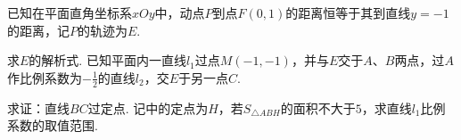 \documentclass[10pt]{article}
\begin{document}
\setcounter{taskcounter}{23}
\begin{questions}{}
\question 已知在平面直角坐标系$xOy$中，动点$P$到点$F(0,1)$的距离恒等于其到直线$y=-1$的距离，记$P$的轨迹为$E$.
\begin{subquestions}
    \subquestion 求$E$的解析式.
    \subquestion 已知平面内一直线$l_1$过点$M(-1,-1)$，并与$E$交于$A$、$B$两点，过$A$作比例系数为$-\frac{1}{2}$的直线$l_2$，交$E$于另一点$C$.
    \begin{subsubquestions}
        \subsubquestion 求证：直线$BC$过定点.
        \subsubquestion 记中的定点为$H$，若$S_{\triangle ABH}$的面积不大于$5$，求直线$l_1$比例系数的取值范围.
    \end{subsubquestions}
\end{subquestions}
\end{questions}
\end{document}
